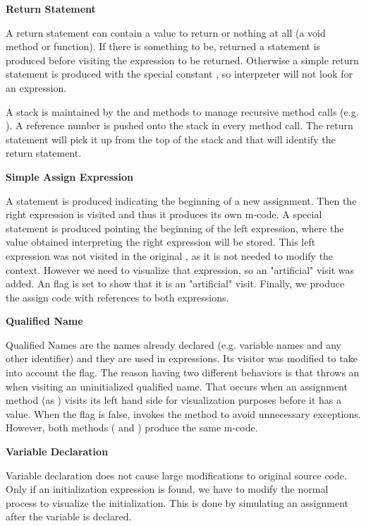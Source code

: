 {\bf{Return Statement}}

A return statement can contain a value to return or nothing at all (a void method or function). If there is something to be, returned a  statement is produced before visiting the expression to be returned. Otherwise a simple return statement is produced with the special constant , so \jel{} interpreter will not look for an expression. 

A stack is maintained by the  and  methods to manage recursive method calls (e.g. ). A reference number is pushed onto the stack in every method call. The return statement will pick it up from the top of the stack and that will identify the return statement.

{\bf{Simple Assign Expression}}

A  statement is produced indicating the beginning of a new assignment. Then the right expression is visited and thus it produces its own m-code. A special statement  is produced
pointing the beginning of the left expression, where the value obtained interpreting the right expression will be stored. This left expression was not visited in the original \djava{}, as
it is not needed to modify the context. However we need to visualize that expression, so an "artificial" visit was added. An  flag is set to show that it is an "artificial" visit. Finally, we produce the assign code with references to both expressions.

{\bf{Qualified Name}}

Qualified Names are the names already declared (e.g. variable names and any other identifier) and they are used in expressions. Its visitor was modified to take into account the  flag. The reason having two different behaviors is that \djava{} throws an  when visiting an uninitialized qualified name. That occurs when an assignment method (as ) visits its left hand side for visualization purposes before it has a value. When the  flag is false, \djava{} invokes the  method to avoid unnecessary exceptions. However, both methods ( and ) produce the same m-code.

{\bf{Variable Declaration}}

Variable declaration does not cause large modifications to original source code. Only if an initialization expression is found, we have to modify the normal process to visualize the initialization. This is done by simulating an assignment after the variable is declared.

